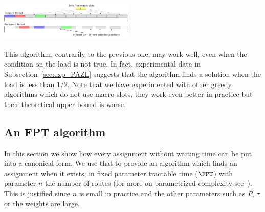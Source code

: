 \documentclass[10pt, conference, letterpaper]{IEEEtran}
\begin{document}
      \begin{center}
      \includegraphics[width=0.48\textwidth]{ex3nt.png}
      \end{center}
% 
% 
% 
	
This algorithm, contrarily to the previous one, may work well, even when the condition on the load is not true.
In fact, experimental data in Subsection~\ref{sec:exp_PAZL} suggests that the algorithm finds a solution when the load is less than $1/2$. Note that we have experimented with other greedy algorithms which do not use macro-slots, they work even better in practice but their theoretical upper bound is worse.

\subsection{An FPT algorithm}

In this section we show how every assignment without waiting time can be put into a canonical form.
We use that to provide an algorithm which finds an assignment when it exists, in fixed parameter tractable time ($\FPT$) with parameter $n$ the number of routes (for more on parametrized complexity see~\cite{downey2012parameterized}). This is justified since $n$ is small in practice and the other parameters such as $P$, $\tau$ or the weights are large.
\end{document}
